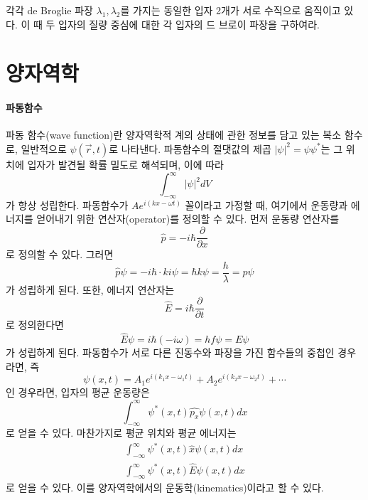 \begin{problem}
각각 de Broglie 파장 $\lambda_1, \lambda_2$를 가지는 동일한 입자 2개가 서로 수직으로 움직이고 있다. 이 때 두 입자의 질량 중심에 대한 각 입자의 드 브로이 파장을 구하여라. 
\end{problem}
\section{양자역학}
\paragraph{파동함수}
파동 함수(wave function)란 양자역학적 계의 상태에 관한 정보를 담고 있는 복소 함수로, 일반적으로 $\psi(\vec{r}, t)$로 나타낸다. 파동함수의 절댓값의 제곱 $|\psi|^2=\psi\psi^*$는 그 위치에 입자가 발견될 확률 밀도로 해석되며, 이에 따라
\begin{equation}
\int_{-\infty}^\infty |\psi|^2 dV
\end{equation}
가 항상 성립한다. 파동함수가 $Ae^{i(kx-\omega t)}$ 꼴이라고 가정할 때, 여기에서 운동량과 에너지를 얻어내기 위한 연산자(operator)를 정의할 수 있다. 먼저 운동량 연산자를
\begin{equation}
\hat{p}=-i\hbar \frac{\partial }{\partial x}
\end{equation}
로 정의할 수 있다. 그러면
\begin{equation}
\hat{p}\psi =-i\hbar\cdot ki\psi=\hbar k\psi=\frac{h}{\lambda}=p\psi
\end{equation}
가 성립하게 된다. 또한, 에너지 연산자는
\begin{equation}
\hat{E}=i\hbar \frac{\partial }{\partial t}
\end{equation}
로 정의한다면 
\begin{equation}
\hat{E}\psi = i\hbar (-i\omega)=hf\psi=E\psi
\end{equation}
가 성립하게 된다. 파동함수가 서로 다른 진동수와 파장을 가진 함수들의 중첩인 경우라면, 즉
\begin{equation}
\psi(x,t)=A_1e^{i(k_1x-\omega_1 t)}+A_2e^{i(k_2x-\omega_2t)}+\cdots
\end{equation}
인 경우라면, 입자의 평균 운동량은
\begin{equation}
\int_{-\infty}^\infty \psi^*(x,t) \hat{p_x}\psi(x,t)dx
\end{equation}
로 얻을 수 있다. 마찬가지로 평균 위치와 평균 에너지는
\begin{align}
\int_{-\infty}^\infty \psi^*(x,t) \hat{x}\psi(x,t)dx\\
\int_{-\infty}^\infty \psi^*(x,t) \hat{E}\psi(x,t)dx
\end{align}
로 얻을 수 있다. 이를 양자역학에서의 운동학(kinematics)이라고 할 수 있다.
